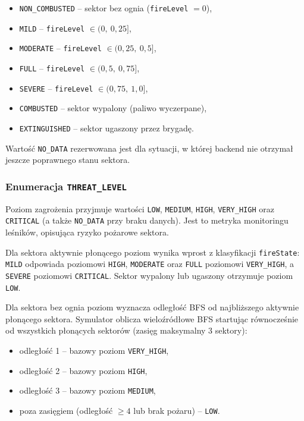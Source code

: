 \documentclass[11pt,a4paper]{article}
\begin{document}
\begin{itemize}
    \item \texttt{NON\_COMBUSTED} -- sektor bez ognia (\texttt{fireLevel} $= 0$),
    \item \texttt{MILD} -- \texttt{fireLevel} $\in (0,\ 0{,}25]$,
    \item \texttt{MODERATE} -- \texttt{fireLevel} $\in (0{,}25,\ 0{,}5]$,
    \item \texttt{FULL} -- \texttt{fireLevel} $\in (0{,}5,\ 0{,}75]$,
    \item \texttt{SEVERE} -- \texttt{fireLevel} $\in (0{,}75,\ 1{,}0]$,
    \item \texttt{COMBUSTED} -- sektor wypalony (paliwo wyczerpane),
    \item \texttt{EXTINGUISHED} -- sektor ugaszony przez brygadę.
\end{itemize}

Wartość \texttt{NO\_DATA} rezerwowana jest dla sytuacji, w której backend nie otrzymał jeszcze poprawnego stanu sektora.

\subsubsection*{Enumeracja \texttt{THREAT\_LEVEL}}

Poziom zagrożenia przyjmuje wartości \texttt{LOW}, \texttt{MEDIUM}, \texttt{HIGH}, \texttt{VERY\_HIGH} oraz \texttt{CRITICAL} (a także \texttt{NO\_DATA} przy braku danych). Jest to metryka monitoringu leśników, opisująca ryzyko pożarowe sektora.

Dla sektora aktywnie płonącego poziom wynika wprost z klasyfikacji \texttt{fireState}: \texttt{MILD} odpowiada poziomowi \texttt{HIGH}, \texttt{MODERATE} oraz \texttt{FULL} poziomowi \texttt{VERY\_HIGH}, a \texttt{SEVERE} poziomowi \texttt{CRITICAL}. Sektor wypalony lub ugaszony otrzymuje poziom \texttt{LOW}.

Dla sektora bez ognia poziom wyznacza odległość BFS od najbliższego aktywnie płonącego sektora. Symulator oblicza wieloźródłowe BFS startując równocześnie od wszystkich płonących sektorów (zasięg maksymalny 3 sektory):

\begin{itemize}
    \item odległość 1 -- bazowy poziom \texttt{VERY\_HIGH},
    \item odległość 2 -- bazowy poziom \texttt{HIGH},
    \item odległość 3 -- bazowy poziom \texttt{MEDIUM},
    \item poza zasięgiem (odległość $\geq 4$ lub brak pożaru) -- \texttt{LOW}.
\end{itemize}
\end{document}
